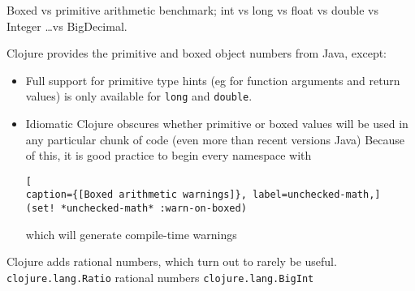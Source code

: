 Boxed vs primitive arithmetic benchmark; 
int vs long vs float vs double vs Integer \ldots vs BigDecimal.


\lstset{language=Clojure}

Clojure provides the primitive and boxed object numbers from Java,
except:
\begin{itemize}
  \item Full support for primitive type hints (eg for function arguments and
  return values) is only available for \lstinline|long| and \lstinline|double|.
  \item Idiomatic Clojure obscures whether primitive or boxed values will be
  used in any particular chunk of code (even more than recent versions  Java)
  Because of this, it is good practice to begin every namespace with
\begin{lstlisting}[
caption={[Boxed arithmetic warnings]}, label=unchecked-math,]  
(set! *unchecked-math* :warn-on-boxed)
\end{lstlisting}
which will generate compile-time warnings
\end{itemize}

Clojure adds rational numbers, which turn out to rarely be useful.\\
\lstinline|clojure.lang.Ratio| rational numbers
\lstinline|clojure.lang.BigInt|~\cite[p.~428]{Emerick2012ClojureProgramming}

